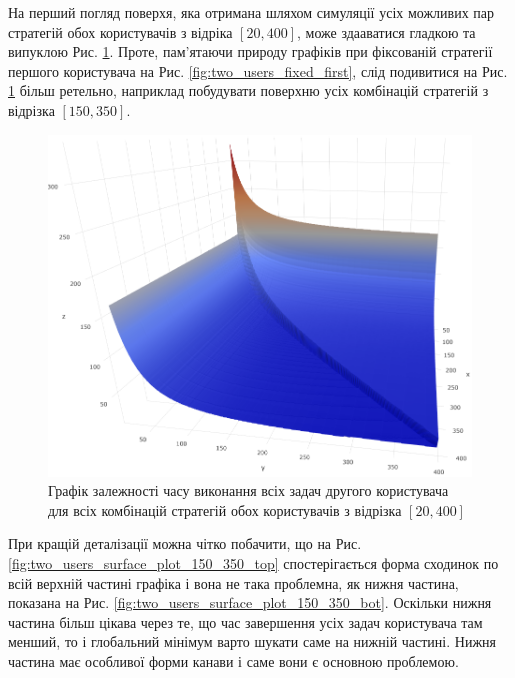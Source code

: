 На перший погляд поверхя, яка отримана шляхом симуляції усіх можливих пар стратегій обох користувачів з відріка $[20, 400]$, може здааватися гладкою та випуклою Рис. \ref{fig:two_users_surface_plot_20_400}. Проте, пам'ятаючи природу графіків при фіксованій стратегії першого користувача на Рис. \ref{fig:two_users_fixed_first}, слід подивитися на Рис. \ref{fig:two_users_surface_plot_20_400} більш ретельно, наприклад побудувати поверхню усіх комбінацій стратегій з відрізка $[150, 350]$.

\begin{figure}[H]
	\centering
	\includegraphics[width=\textwidth]{practice/img/two_users_surface_plot_20_400}
	\caption{Графік залежності часу виконання всіх задач другого користувача для всіх комбінацій стратегій обох користувачів з відрізка $[20, 400]$}
	\label{fig:two_users_surface_plot_20_400}
\end{figure}

При кращій деталізації можна чітко побачити, що на Рис. \ref{fig:two_users_surface_plot_150_350_top} спостерігається форма сходинок по всій верхній частині графіка і вона не така проблемна, як нижня частина, показана на Рис. \ref{fig:two_users_surface_plot_150_350_bot}. Оскільки нижня частина більш цікава через те, що час завершення усіх задач користувача там менший, то і глобальний мінімум варто шукати саме на нижній частині. Нижня частина має особливої форми канави і саме вони є основною проблемою.

